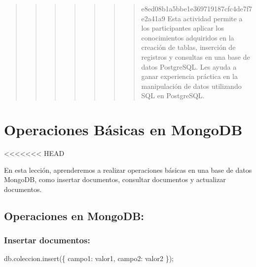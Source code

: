 \documentclass[
  a4paper,
  onepage,
  openany]{scrreprt}
\newenvironment{Shaded}{\begin{snugshade}}{\end{snugshade}}
\newcommand{\NormalTok}[1]{\textcolor[rgb]{0.00,0.23,0.31}{#1}}
\begin{document}
\begin{quote}
\begin{quote}
\begin{quote}
\begin{quote}
\begin{quote}
\begin{quote}
\begin{quote}
e8ed08b1a5bbe1e369719187cfc4de7f7e2a41a9 Esta actividad permite a los
participantes aplicar los conocimientos adquiridos en la creación de
tablas, inserción de registros y consultas en una base de datos
PostgreSQL. Les ayuda a ganar experiencia práctica en la manipulación de
datos utilizando SQL en PostgreSQL.
\end{quote}
\end{quote}
\end{quote}
\end{quote}
\end{quote}
\end{quote}
\end{quote}

\hypertarget{operaciones-buxe1sicas-en-mongodb-2}{%
\chapter{Operaciones Básicas en
MongoDB}\label{operaciones-buxe1sicas-en-mongodb-2}}

\textless\textless\textless\textless\textless\textless\textless{} HEAD

En esta lección, aprenderemos a realizar operaciones básicas en una base
de datos MongoDB, como insertar documentos, consultar documentos y
actualizar documentos.

\hypertarget{operaciones-en-mongodb}{%
\section{Operaciones en MongoDB:}\label{operaciones-en-mongodb}}

\hypertarget{insertar-documentos}{%
\subsection{Insertar documentos:}\label{insertar-documentos}}

\begin{Shaded}
\begin{Highlighting}[]
\NormalTok{db.coleccion.insert(\{ campo1: valor1, campo2: valor2 \});}
\end{Highlighting}
\end{Shaded}
\end{document}
